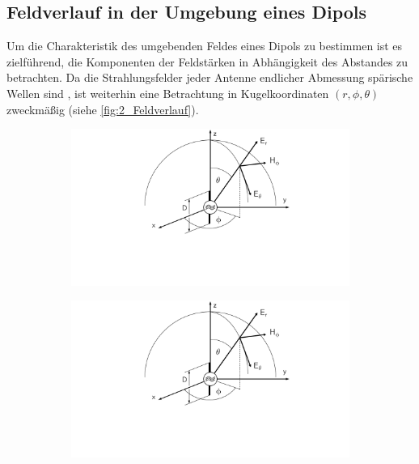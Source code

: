 \subsection{Feldverlauf in der Umgebung eines Dipols}\label{cha:2_sub_Feldverlauf_in_Umgebung_eines_Dipols}

Um die Charakteristik des umgebenden Feldes eines Dipols zu bestimmen ist es zielführend, die Komponenten der Feldstärken in Abhängigkeit des Abstandes zu betrachten. Da die Strahlungsfelder jeder Antenne endlicher Abmessung spärische Wellen sind \cite{Antenna_Theory}, ist weiterhin eine Betrachtung in Kugelkoordinaten $\left(r, \phi, \theta\right)$ zweckmäßig (siehe \Abb \ref{fig:2_Feldverlauf}). 

\begin{figure}
    \centering
    \begin{subfigure}[c]{0.3\textheight}
        \includegraphics[page = 1, width=\textwidth, trim = 8.5cm 5cm 7cm 0cm, clip]{Abbildungen/Kapitel2/Hertz'scher_Dipol.pdf}
        \caption{\label{subfig:2_Feldverlauf_Koordinatensystem}}
    \end{subfigure}
    \hspace{1cm}
    \begin{subfigure}[c]{0.3\textheight}
        \includegraphics[page = 2, width=\textwidth, trim = 8.5cm 3cm 7cm 2cm, clip]{Abbildungen/Kapitel2/Hertz'scher_Dipol.pdf}

\end{subfigure}
\end{figure}
